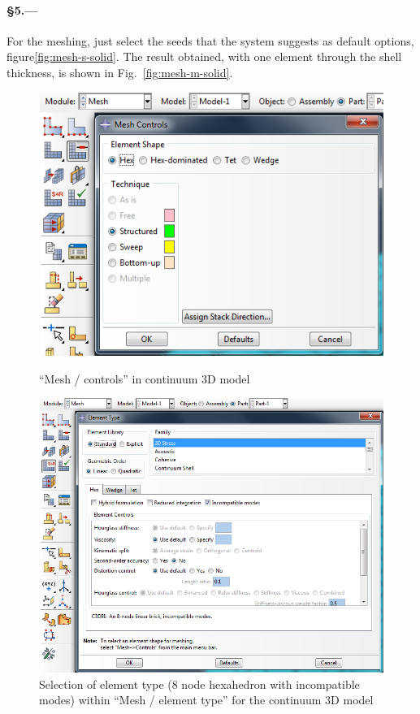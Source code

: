 \documentclass[english,a4paper,12pt]{article}
\begin{document}
\paragraph{\S5.---}
For the meshing, just select the seeds that the system suggests as default options, figure\ref{fig:mesh-s-solid}.
The result obtained, with one element through the shell thickness, is shown in Fig.~\ref{fig:mesh-m-solid}.
\begin{figure}[h!tp]
\parbox[t]{0.39\textwidth}{%
\includegraphics[width=\linewidth]{capturas/42-mesh-solid.png}
\caption{``Mesh / controls'' in continuum 3D model}
\label{fig:mesh-c-solid}
}\quad
\parbox[t]{0.59\textwidth}{%
\includegraphics[width=\linewidth]{capturas/43-mesh-solid.png}
\caption{Selection of element type (8 node hexahedron with incompatible modes) within ``Mesh / element type'' for the continuum 3D model}
\label{fig:mesh-e-solid}
}%
\end{figure}
\end{document}
